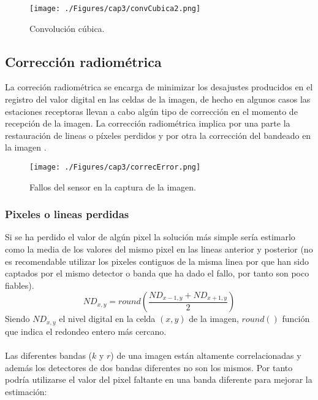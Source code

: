 \begin{itemize}
		    \begin{figure}[H]
		    	\centering
		    	\texttt{[image: ./Figures/cap3/convCubica2.png]}
		    	\caption{Convoluci\'on c\'ubica.}
		    	\label{fig:convCubica2}
		    \end{figure}
	\end{itemize}


\subsection{Correcci\'on radiom\'etrica}
La correci\'on radiom\'etrica se encarga de minimizar los desajustes producidos en el registro del valor digital en las celdas de la imagen, de hecho en algunos casos las estaciones receptoras llevan a cabo alg\'un tipo de correcci\'on en el momento de recepci\'on de la imagen. La corrección radiom\'etrica implica por una parte la restauraci\'on de lineas o p\'ixeles perdidos y por otra la correcci\'on del bandeado en la imagen \cite{teledUm}.
    \begin{figure}[H]
    	\centering
    	\texttt{[image: ./Figures/cap3/correcError.png]}
    	\caption{Fallos del sensor en la captura de la imagen.}
    	\label{fig:correcError}
    \end{figure}

\subsubsection{Pixeles o lineas perdidas}\label{subsec:pixelesP}
Si se ha perdido el valor de alg\'un pixel la solución m\'as simple ser\'ia estimarlo como la media de los valores
del mismo pixel en las lineas anterior y posterior (no es recomendable utilizar los pixeles contiguos de la misma linea por que han sido captados por el mismo detector o banda que ha dado el fallo, por tanto son
poco fiables).
		\begin{equation}
		ND_{x,y} = round(\dfrac{ND_{x-1,y} + ND_{x+1,y}}{2})
		\end{equation} 
Siendo $ ND_{x,y} $ el nivel digital en la celda $ (x,y) $ de la imagen, $ round() $ funci\'on que indica el redondeo entero m\'as cercano.\\~\\
Las diferentes bandas ($ k $ y $ r $) de una imagen están altamente correlacionadas y adem\'as los detectores de dos bandas diferentes no son los mismos. Por tanto podría utilizarse el valor del pixel faltante en una banda diferente para mejorar la estimaci\'on:

